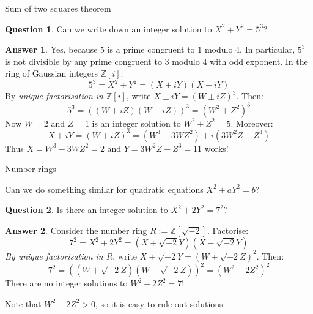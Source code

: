 \documentclass[10pt]{beamer}
\theoremstyle{definition}
\newtheorem{answer}{Answer}
\newtheorem{question}{Question}
\begin{document}
\begin{frame}[t]{Sum of two squares theorem}

\begin{question}
Can we write down an integer solution to $ X^2 + Y^2 = 5^3 $?
\end{question}

\begin{answer}
Yes, because $ 5 $ is a prime congruent to $ 1 $ modulo $ 4 $. In particular, $ 5^3 $ is not divisible by any prime congruent to $ 3 $ modulo $ 4 $ with odd exponent. In the ring of Gaussian integers $ \mathbb{Z}[i] $:
$$ 5^3 = X^2 + Y^2 = (X + iY)(X - iY) $$
By \emph{unique factorisation in $ \mathbb{Z}[i] $}, write $ X \pm iY = (W \pm iZ)^3 $. Then:
$$ 5^3 = ((W + iZ)(W - iZ))^3 = (W^2 + Z^2)^3 $$
Now $ W = 2 $ and $ Z = 1 $ is an integer solution to $ W^2 + Z^2 = 5 $. Moreover:
$$ X + iY = (W + iZ)^3 = (W^3 - 3WZ^2) + i(3W^2Z - Z^3) $$
Thus $ X = W^3 - 3WZ^2 = 2 $ and $ Y = 3W^2Z - Z^3 = 11 $ works!
\end{answer}

\end{frame}

\begin{frame}[t]{Number rings}

Can we do something similar for quadratic equations $ X^2 + aY^2 = b $?

\vspace{0.5cm}

\begin{question}
Is there an integer solution to $ X^2 + 2Y^2 = 7^2 $?
\end{question}

\begin{answer}
Consider the number ring $ R := \mathbb{Z}[\sqrt{-2}] $. Factorise:
$$ 7^2 = X^2 + 2Y^2 = (X + \sqrt{-2}Y)(X - \sqrt{-2}Y) $$
\emph{By unique factorisation in $ R $}, write $ X \pm \sqrt{-2}Y = (W \pm \sqrt{-2}Z)^2 $. Then:
$$ 7^2 = ((W + \sqrt{-2}Z)(W - \sqrt{-2}Z))^2 = (W^2 + 2Z^2)^2 $$
There are no integer solutions to $ W^2 + 2Z^2 = 7 $!
\end{answer}

\vspace{0.5cm} Note that $ W^2 + 2Z^2 > 0 $, so it is easy to rule out solutions.

\end{frame}
\end{document}
